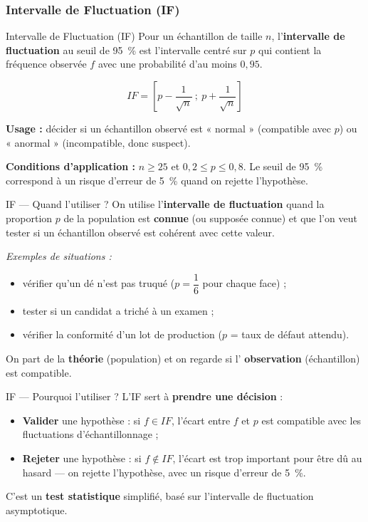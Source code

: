 \documentclass[11pt,a4paper]{article}
\newcommand{\IF}{\textit{IF}}
\begin{document}
	\subsubsection{Intervalle de Fluctuation (IF)}
	
	\begin{ficheoutils}{Intervalle de Fluctuation (IF)}
		Pour un échantillon de taille $n$, l'\textbf{intervalle de fluctuation} au seuil
		de 95~\% est l'intervalle centré sur $p$ qui contient la fréquence observée $f$
		avec une probabilité d'au moins $0{,}95$.
		\begin{formule}
			\[ \IF{} = \left[p - \dfrac{1}{\sqrt{n}}\ ;\ p + \dfrac{1}{\sqrt{n}}\right] \]
		\end{formule}
		\textbf{Usage :} décider si un échantillon observé est « normal » (compatible
		avec $p$) ou « anormal » (incompatible, donc suspect).
		\begin{notebox}
			\textbf{Conditions d'application :} $n \geq 25$ et $0{,}2 \leq p \leq 0{,}8$.
			Le seuil de 95~\% correspond à un risque d'erreur de 5~\% quand on rejette
			l'hypothèse.
		\end{notebox}
	\end{ficheoutils}
	
	\begin{ficheoutils}{IF — Quand l'utiliser ?}
		On utilise l'\textbf{intervalle de fluctuation} quand la proportion $p$ de la
		population est \textbf{connue} (ou supposée connue) et que l'on veut tester si
		un échantillon observé est cohérent avec cette valeur.
		
		\emph{Exemples de situations :}
		\begin{itemize}
			\item vérifier qu'un dé n'est pas truqué ($p = \dfrac{1}{6}$ pour chaque face) ;
			\item tester si un candidat a triché à un examen ;
			\item vérifier la conformité d'un lot de production ($p$ = taux de défaut attendu).
		\end{itemize}
		On part de la \textbf{théorie} (population) et on regarde si l'
		\textbf{observation} (échantillon) est compatible.
	\end{ficheoutils}
	
	\begin{ficheoutils}{IF — Pourquoi l'utiliser ?}
		L'IF sert à \textbf{prendre une décision} :
		\begin{itemize}
			\item \textbf{Valider} une hypothèse : si $f \in \IF{}$, l'écart entre $f$ et
			$p$ est compatible avec les fluctuations d'échantillonnage ;
			\item \textbf{Rejeter} une hypothèse : si $f \notin \IF{}$, l'écart est trop
			important pour être dû au hasard — on rejette l'hypothèse, avec un risque
			d'erreur de 5~\%.
		\end{itemize}
		C'est un \textbf{test statistique} simplifié, basé sur l'intervalle de
		fluctuation asymptotique.
	\end{ficheoutils}
	
\end{document}
